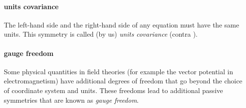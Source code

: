 \documentclass{article}
\theoremstyle{plain}
\theoremstyle{definition}
\theoremstyle{remark}
\begin{document}
\paragraph{units covariance}
The left-hand side and the right-hand side of any equation must have the same units.
This symmetry is called (by us) \emph{units covariance} (contra \cite{villar2022dimensionless}).

\paragraph{gauge freedom}
Some physical quantities in field theories (for example the vector potential in electromagnetism) have additional degrees of freedom that go beyond the choice of coordinate system and units.
These freedoms lead to additional passive symmetries that are known as \emph{gauge freedom}.
\end{document}
